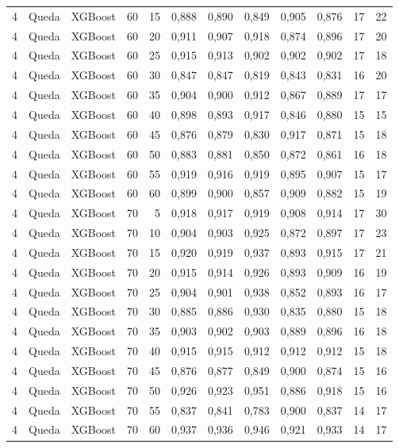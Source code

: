 \begin{longtable}{@{}rllrrrrrrrrr@{}}
4 & Queda & XGBoost & 60 & 15 & 0,888 & 0,890 & 0,849 & 0,905 & 0,876 & 17 & 22 \\
4 & Queda & XGBoost & 60 & 20 & 0,911 & 0,907 & 0,918 & 0,874 & 0,896 & 17 & 20 \\
4 & Queda & XGBoost & 60 & 25 & 0,915 & 0,913 & 0,902 & 0,902 & 0,902 & 17 & 18 \\
4 & Queda & XGBoost & 60 & 30 & 0,847 & 0,847 & 0,819 & 0,843 & 0,831 & 16 & 20 \\
4 & Queda & XGBoost & 60 & 35 & 0,904 & 0,900 & 0,912 & 0,867 & 0,889 & 17 & 17 \\
4 & Queda & XGBoost & 60 & 40 & 0,898 & 0,893 & 0,917 & 0,846 & 0,880 & 15 & 15 \\
4 & Queda & XGBoost & 60 & 45 & 0,876 & 0,879 & 0,830 & 0,917 & 0,871 & 15 & 18 \\
4 & Queda & XGBoost & 60 & 50 & 0,883 & 0,881 & 0,850 & 0,872 & 0,861 & 16 & 18 \\
4 & Queda & XGBoost & 60 & 55 & 0,919 & 0,916 & 0,919 & 0,895 & 0,907 & 15 & 17 \\
4 & Queda & XGBoost & 60 & 60 & 0,899 & 0,900 & 0,857 & 0,909 & 0,882 & 15 & 19 \\
4 & Queda & XGBoost & 70 & 5 & 0,918 & 0,917 & 0,919 & 0,908 & 0,914 & 17 & 30 \\
4 & Queda & XGBoost & 70 & 10 & 0,904 & 0,903 & 0,925 & 0,872 & 0,897 & 17 & 23 \\
4 & Queda & XGBoost & 70 & 15 & 0,920 & 0,919 & 0,937 & 0,893 & 0,915 & 17 & 21 \\
4 & Queda & XGBoost & 70 & 20 & 0,915 & 0,914 & 0,926 & 0,893 & 0,909 & 16 & 19 \\
4 & Queda & XGBoost & 70 & 25 & 0,904 & 0,901 & 0,938 & 0,852 & 0,893 & 16 & 17 \\
4 & Queda & XGBoost & 70 & 30 & 0,885 & 0,886 & 0,930 & 0,835 & 0,880 & 15 & 18 \\
4 & Queda & XGBoost & 70 & 35 & 0,903 & 0,902 & 0,903 & 0,889 & 0,896 & 16 & 18 \\
4 & Queda & XGBoost & 70 & 40 & 0,915 & 0,915 & 0,912 & 0,912 & 0,912 & 15 & 18 \\
4 & Queda & XGBoost & 70 & 45 & 0,876 & 0,877 & 0,849 & 0,900 & 0,874 & 15 & 16 \\
4 & Queda & XGBoost & 70 & 50 & 0,926 & 0,923 & 0,951 & 0,886 & 0,918 & 15 & 16 \\
4 & Queda & XGBoost & 70 & 55 & 0,837 & 0,841 & 0,783 & 0,900 & 0,837 & 14 & 17 \\
4 & Queda & XGBoost & 70 & 60 & 0,937 & 0,936 & 0,946 & 0,921 & 0,933 & 14 & 17 \\

\end{longtable}
